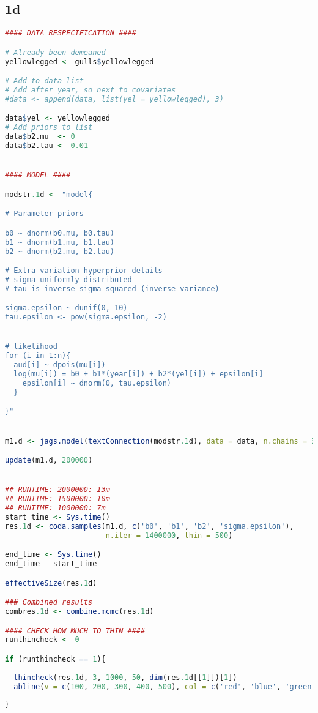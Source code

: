 \documentclass[11pt]{article}
\begin{document}
\subsection{1d} \label{appA1d}
\begin{lstlisting}[language=R]
#### DATA RESPECIFICATION ####

# Already been demeaned
yellowlegged <- gulls$yellowlegged

# Add to data list
# Add after year, so next to covariates
#data <- append(data, list(yel = yellowlegged), 3)

data$yel <- yellowlegged
# Add priors to list
data$b2.mu  <- 0
data$b2.tau <- 0.01


#### MODEL ####

modstr.1d <- "model{

# Parameter priors

b0 ~ dnorm(b0.mu, b0.tau)
b1 ~ dnorm(b1.mu, b1.tau)
b2 ~ dnorm(b2.mu, b2.tau)

# Extra variation hyperprior details
# sigma uniformly distributed
# tau is inverse sigma squared (inverse variance)

sigma.epsilon ~ dunif(0, 10)
tau.epsilon <- pow(sigma.epsilon, -2)


# likelihood
for (i in 1:n){
  aud[i] ~ dpois(mu[i])
  log(mu[i]) = b0 + b1*(year[i]) + b2*(yel[i]) + epsilon[i]
    epsilon[i] ~ dnorm(0, tau.epsilon)
  }

}"


m1.d <- jags.model(textConnection(modstr.1d), data = data, n.chains = 3)

update(m1.d, 200000)


## RUNTIME: 2000000: 13m
## RUNTIME: 1500000: 10m
## RUNTIME: 1000000: 7m
start_time <- Sys.time()
res.1d <- coda.samples(m1.d, c('b0', 'b1', 'b2', 'sigma.epsilon'), 
                       n.iter = 1400000, thin = 500)

end_time <- Sys.time()
end_time - start_time

effectiveSize(res.1d)

### Combined results
combres.1d <- combine.mcmc(res.1d)

#### CHECK HOW MUCH TO THIN ####
runthincheck <- 0

if (runthincheck == 1){
  
  thincheck(res.1d, 3, 1000, 50, dim(res.1d[[1]])[1])
  abline(v = c(100, 200, 300, 400, 500), col = c('red', 'blue', 'green', 'purple', 'pink'))
  
} 






\end{lstlisting}
\end{document}
